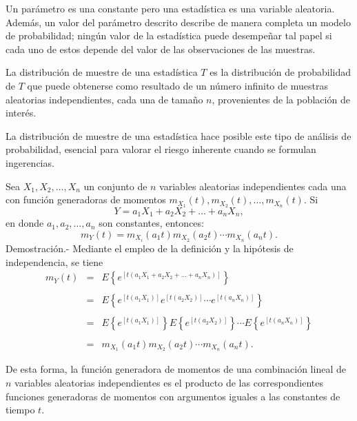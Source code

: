 Un parámetro es una constante pero una estadística es una variable aleatoria. Además, un valor del parámetro descrito describe de manera completa un modelo de probabilidad; ningún valor de la estadística puede desempeñar tal papel si cada uno de estos depende del valor de las observaciones de las muestras. 

\begin{def.}
    La distribución de muestre de una estadística $T$ es la distribución de probabilidad de $T$ que puede obtenerse como resultado de un número infinito de muestras aleatorias independientes, cada una de tamaño $n$, provenientes de la población de interés.
\end{def.}

La distribución de muestre de una estadística hace posible este tipo de análisis de probabilidad, esencial para valorar el riesgo inherente cuando se formulan ingerencias.

\begin{teo}
    Sea $X_1,X_2,\ldots, X_n$ un conjunto de $n$ variables aleatorias independientes cada una con función generadoras de momentos $m_{X_1}(t),m_{X_2}(t),\ldots , m_{X_n}(t).$
    Si 
    $$Y=a_1X_1+a_2X_2+\ldots + a_nX_n,$$
    en donde $a_1,a_2,\ldots,a_n$ son constantes, entonces:
    $$m_Y(t)=m_{X_i}(a_1t)m_{X_2}(a_2t)\cdots m_{X_n}(a_nt).$$
	Demostración.-\; Mediante el empleo de la definición y la hipótesis de independencia, se tiene
	$$\begin{array}{rcl}
	    m_Y(t)&=&E\left\{e^{\left[t\left(a_1X_1+a_2X_2+\ldots + a_nX_n\right)\right]}\right\}\\\\
		  &=&E\left\{e^{\left[t\left(a_1X_1\right)\right]}e^{\left[t\left(a_2X_2\right)\right]}\cdots e^{\left[t\left(a_nX_n\right)\right]}\right\}\\\\
		  &=&E\left\{e^{\left[t\left(a_1X_1\right)\right]}\right\}E\left\{e^{\left[t\left(a_2X_2\right)\right]}\right\}\cdots E\left\{e^{\left[t\left(a_nX_n\right)\right]}\right\}\\\\
		  &=&m_{X_1}(a_1t)m_{X_2}(a_2t)\cdots m_{X_n}(a_nt).
	\end{array}$$
\end{teo}

De esta forma, la función generadora de momentos de una combinación lineal de $n$ variables aleatorias independientes es el producto de las correspondientes funciones generadoras de momentos con argumentos iguales a las constantes de tiempo $t$.

